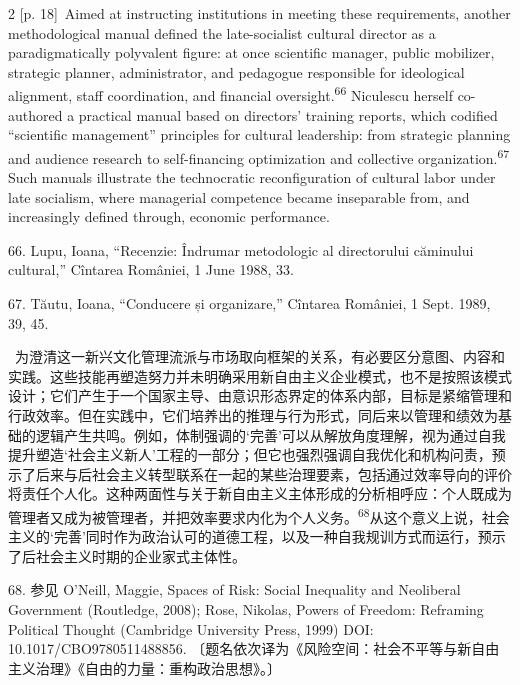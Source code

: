 \documentclass[10pt,a4paper]{article}
\begin{document}
\begin{paracol}{2}
\switchcolumn
{\scriptsize\color{gray} [p. 18]}\ Aimed at instructing institutions in meeting these requirements, another methodological manual defined the late-socialist cultural director as a paradigmatically polyvalent figure: at once scientific manager, public mobilizer, strategic planner, administrator, and pedagogue responsible for ideological alignment, staff coordination, and financial oversight.\nobreak\textsuperscript{66} Niculescu herself co-authored a practical manual based on directors’ training reports, which codified “scientific management” principles for cultural leadership: from strategic planning and audience research to self-financing optimization and collective organization.\nobreak\textsuperscript{67} Such manuals illustrate the technocratic reconfiguration of cultural labor under late socialism, where managerial competence became inseparable from, and increasingly defined through, economic performance.\par{\small 66. Lupu, Ioana, “Recenzie: Îndrumar metodologic al directorului căminului cultural,” Cîntarea României, 1 June 1988, 33.\par}{\small 67. Tăutu, Ioana, “Conducere și organizare,” Cîntarea României, 1 Sept. 1989, 39, 45.\par}
\switchcolumn*
{\scriptsize\color{gray} [p. 18]}\ 为澄清这一新兴文化管理流派与市场取向框架的关系，有必要区分意图、内容和实践。这些技能再塑造努力并未明确采用新自由主义企业模式，也不是按照该模式设计；它们产生于一个国家主导、由意识形态界定的体系内部，目标是紧缩管理和行政效率。但在实践中，它们培养出的推理与行为形式，同后来以管理和绩效为基础的逻辑产生共鸣。例如，体制强调的‘完善’可以从解放角度理解，视为通过自我提升塑造‘社会主义新人’工程的一部分；但它也强烈强调自我优化和机构问责，预示了后来与后社会主义转型联系在一起的某些治理要素，包括通过效率导向的评价将责任个人化。这种两面性与关于新自由主义主体形成的分析相呼应：个人既成为管理者又成为被管理者，并把效率要求内化为个人义\mbox{务。\textsuperscript{68}}从这个意义上说，社会主义的‘完善’同时作为政治认可的道德工程，以及一种自我规训方式而运行，预示了后社会主义时期的企业家式主体性。\par{\small 68. 参见 O’Neill, Maggie, Spaces of Risk: Social Inequality and Neoliberal Government (Routledge, 2008); Rose, Nikolas, Powers of Freedom: Reframing Political Thought (Cambridge University Press, 1999) DOI: 10.1017/CBO9780511488856. 〔题名依次译为《风险空间：社会不平等与新自由主义治理》《自由的力量：重构政治思想》。〕\par}
\switchcolumn

\end{paracol}
\end{document}
